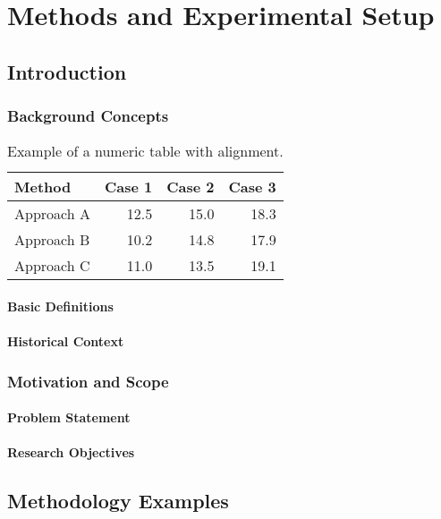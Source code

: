 \chapter{Methods and Experimental Setup} \label{CH2}

\section{Introduction }
\lipsum[1-3]
\subsection{Background Concepts}
\lipsum[1]
\begin{table}[h!]
	\centering
	\caption{Example of a numeric table with alignment.}
	\small
	\begin{tabular}{|l|r|r|r|}
		\hline
		\textbf{Method} & \textbf{Case 1} & \textbf{Case 2} & \textbf{Case 3} \\ \hline
		Approach A & 12.5 & 15.0 & 18.3 \\ \hline
		Approach B & 10.2 & 14.8 & 17.9 \\ \hline
		Approach C & 11.0 & 13.5 & 19.1 \\ \hline
	\end{tabular}
	\label{tab:numeric}
\end{table}
	\subsubsection{Basic Definitions}
	\subsubsection{Historical Context}

\subsection{Motivation and Scope}
	\subsubsection{Problem Statement}
	\subsubsection{Research Objectives}

\section{Methodology Examples}
\lipsum[1]
